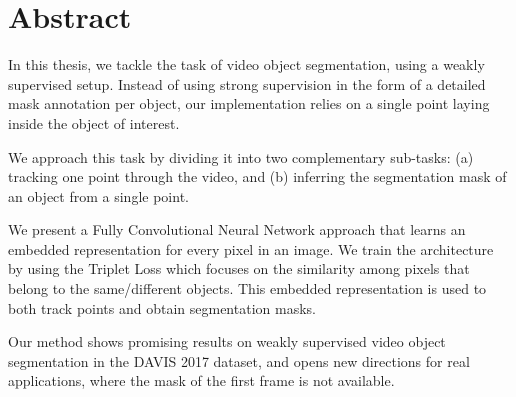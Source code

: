 
\chapter*{Abstract}
\label{cha:abstract}

In this thesis, we tackle the task of video object segmentation, using a weakly supervised setup.
Instead of using strong supervision in the form of a detailed mask annotation per object, our implementation relies on a single point laying inside the object of interest.

We approach this task by dividing it into two complementary sub-tasks: 
(a) tracking one point through the video,
and (b) inferring the segmentation mask of an object from a single point.

We present a Fully Convolutional Neural Network approach that learns an embedded representation for every pixel in an image.
We train the architecture by using the Triplet Loss which focuses on the similarity among pixels that belong to the same/different objects.
This embedded representation is used to both track points and obtain segmentation masks.

Our method shows promising results on weakly supervised video object segmentation in the DAVIS 2017 dataset, and opens new directions for real applications, where the mask of the first frame is not available.
